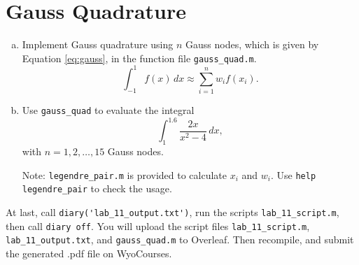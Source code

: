 \section{Gauss Quadrature}
\begin{enumerate}[(a)]
    \item Implement Gauss quadrature using $n$ Gauss nodes, which is given by Equation \eqref{eq:gauss}, in the function file \verb|gauss_quad.m|.
        \begin{equation}
            \label{eq:gauss}
            \int_{-1}^{1} f(x) \, dx \approx \sum_{i=1}^{n} w_i f(x_i).
        \end{equation}
    \item Use \verb|gauss_quad| to evaluate the integral
        $$
        \int_{1}^{1.6} \frac{2x}{x^2 - 4} \, dx,
        $$
        with $n = 1, 2, \ldots , 15$ Gauss nodes.

        Note: \verb|legendre_pair.m| is provided to calculate $x_i$ and $w_i$. Use \verb|help legendre_pair| to check the usage.
\end{enumerate}

At last, call \verb|diary('lab_11_output.txt')|, run the scripts \verb|lab_11_script.m|, then call \verb|diary off|. You will upload the script files \verb|lab_11_script.m|, \verb|lab_11_output.txt|, and \verb|gauss_quad.m| to Overleaf. Then recompile, and submit the generated .pdf file on WyoCourses.
